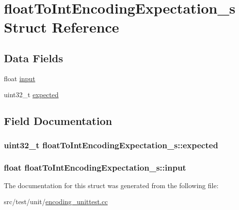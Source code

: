 \hypertarget{structfloatToIntEncodingExpectation__s}{\section{float\+To\+Int\+Encoding\+Expectation\+\_\+s Struct Reference}
\label{structfloatToIntEncodingExpectation__s}
}
\subsection*{Data Fields}
\begin{DoxyCompactItemize}
\item 
float \hyperlink{structfloatToIntEncodingExpectation__s_acd044bb8c3c1512ea472cabff05a0e1f}{input}
\item 
uint32\+\_\+t \hyperlink{structfloatToIntEncodingExpectation__s_a33ccbdc9fa093a175bba81d36f2c3a58}{expected}
\end{DoxyCompactItemize}


\subsection{Field Documentation}
\hypertarget{structfloatToIntEncodingExpectation__s_a33ccbdc9fa093a175bba81d36f2c3a58}{
\subsubsection[{expected}]{\setlength{\rightskip}{0pt plus 5cm}uint32\+\_\+t float\+To\+Int\+Encoding\+Expectation\+\_\+s\+::expected}}\label{structfloatToIntEncodingExpectation__s_a33ccbdc9fa093a175bba81d36f2c3a58}
\hypertarget{structfloatToIntEncodingExpectation__s_acd044bb8c3c1512ea472cabff05a0e1f}{
\subsubsection[{input}]{\setlength{\rightskip}{0pt plus 5cm}float float\+To\+Int\+Encoding\+Expectation\+\_\+s\+::input}}\label{structfloatToIntEncodingExpectation__s_acd044bb8c3c1512ea472cabff05a0e1f}


The documentation for this struct was generated from the following file\+:\begin{DoxyCompactItemize}
\item 
src/test/unit/\hyperlink{encoding__unittest_8cc}{encoding\+\_\+unittest.\+cc}\end{DoxyCompactItemize}
